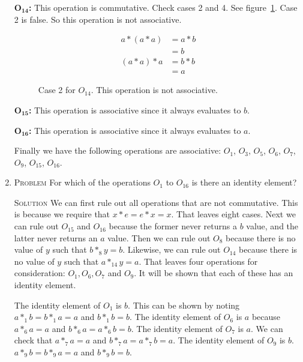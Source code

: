 \documentclass{amsart}
\newcommand{\Solution}{\textsc{Solution}\xspace}
\newcommand{\Problem}{\textsc{Problem}\xspace}
\begin{document}
\begin{enumerate}
   $\mathbf{O_{14}}$\textbf{:} This operation is commutative. Check cases
   2 and 4. See figure~\ref{fig:o14_assoc}. Case 2 is false. So this
   operation is not associative.

   \begin{figure}
      \caption{Case 2 for $O_{14}$. This operation is not associative.}
      \label{fig:o14_assoc}
      \begin{align*}
         a * (a * a) & = a * b \\
	             & = b \\
         (a * a) * a & = b * b \\
	             & = a
      \end{align*}
   \end{figure}

   $\mathbf{O_{15}}$\textbf{:} This operation is associative since it
   always evaluates to $b$.

   $\mathbf{O_{16}}$\textbf{:} This operation is associative since
   it always evaluates to $a$.

   Finally we have the following operations are associative: $O_1$, 
   $O_3$, $O_5$, $O_6$, $O_7$, $O_9$, $O_15$, $O_16$.

   \item \Problem For which of the operations $O_1$ to $O_{16}$ is there an 
   identity element?

   \noindent \Solution We can first rule out all operations that are not
   commutative. This is because we require that $x*e=e*x=x$. That leaves
   eight cases. Next we can rule out $O_{15}$ and $O_{16}$ because the
   former never returns a $b$ value, and the latter never returns an $a$
   value. Then we can rule out $O_8$ because there is no value of $y$ such
   that $b *_8 y = b$. Likewise, we can rule out $O_{14}$ because there
   is no value of $y$ such that $a *_{14} y = a$. That leaves four operations
   for consideration: $O_1, O_6, O_7$ and $O_9$. It will be shown
   that each of these has an identity element.

   The identity element of $O_1$ is $b$. This can be shown by noting
   $a *_{1} b = b *_{1} a = a$ and $b *_1 b = b$. The identity element
   of $O_6$ is $a$ because $a *_6 a = a$ and $b *_6 a = a *_6 b = b$.
   The identity element of $O_7$ is $a$. We can check that $a *_7 a = a$ and
   $b *_7 a = a *_7 b = a$. The identity element of $O_9$ is $b$.
   $a *_9 b = b *_9 a = a$ and $b *_9 b = b$.


\end{enumerate}
\end{document}
